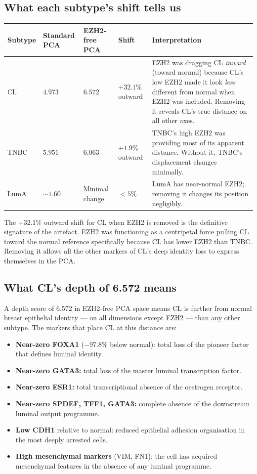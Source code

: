\documentclass[12pt, a4paper]{article}
\begin{document}
\subsection{What each subtype's shift tells us}

\begin{center}
\begin{tabular}{p{2cm}p{2.5cm}p{2.5cm}p{2cm}p{4cm}}
\toprule
\textbf{Subtype} &
\textbf{Standard PCA} &
\textbf{EZH2-free PCA} &
\textbf{Shift} &
\textbf{Interpretation} \\
\midrule
CL &
$4.973$ &
$6.572$ &
$+32.1\%$ outward &
EZH2 was dragging CL \textit{inward} (toward
normal) because CL's low EZH2 made it look
\textit{less} different from normal when EZH2
was included. Removing it reveals CL's true
distance on all other axes. \\[0.5em]
TNBC &
$5.951$ &
$6.063$ &
$+1.9\%$ outward &
TNBC's high EZH2 was providing most of its
apparent distance. Without it, TNBC's
displacement changes minimally. \\[0.5em]
LumA &
$\sim1.60$ &
Minimal change &
$<5\%$ &
LumA has near-normal EZH2; removing it
changes its position negligibly. \\
\bottomrule
\end{tabular}
\end{center}

The $+32.1\%$ outward shift for CL when EZH2
is removed is the definitive signature of the
artefact. EZH2 was functioning as a centripetal
force pulling CL toward the normal reference
specifically because CL has lower EZH2 than
TNBC. Removing it allows all the other markers
of CL's deep identity loss to express themselves
in the PCA.

\subsection{What CL's depth of 6.572 means}

A depth score of 6.572 in EZH2-free PCA space
means CL is further from normal breast epithelial
identity --- on all dimensions except EZH2 ---
than any other subtype. The markers that place
CL at this distance are:

\begin{itemize}
    \item \textbf{Near-zero FOXA1} ($-97.8\%$
    below normal): total loss of the pioneer
    factor that defines luminal identity.
    \item \textbf{Near-zero GATA3:} total loss
    of the master luminal transcription factor.
    \item \textbf{Near-zero ESR1:} total
    transcriptional absence of the oestrogen
    receptor.
    \item \textbf{Near-zero SPDEF, TFF1, GATA3:}
    complete absence of the downstream luminal
    output programme.
    \item \textbf{Low CDH1} relative to normal:
    reduced epithelial adhesion organisation
    in the most deeply arrested cells.
    \item \textbf{High mesenchymal markers}
    (VIM, FN1): the cell has acquired
    mesenchymal features in the absence of
    any luminal programme.
\end{itemize}
\end{document}
